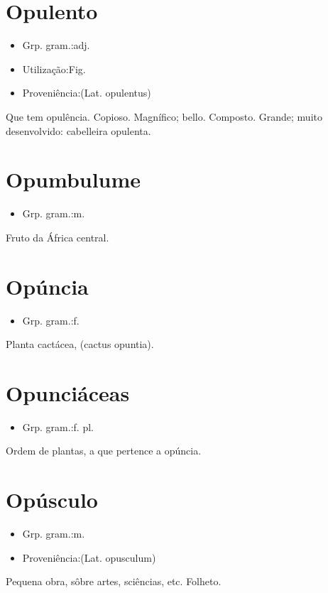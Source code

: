 \section{Opulento}
\begin{itemize}
\item {Grp. gram.:adj.}
\end{itemize}
\begin{itemize}
\item {Utilização:Fig.}
\end{itemize}
\begin{itemize}
\item {Proveniência:(Lat. \textunderscore opulentus\textunderscore )}
\end{itemize}
Que tem opulência.
Copioso.
Magnífico; bello.
Composto.
Grande; muito desenvolvido: \textunderscore cabelleira opulenta\textunderscore .
\section{Opumbulume}
\begin{itemize}
\item {Grp. gram.:m.}
\end{itemize}
Fruto da África central.
\section{Opúncia}
\begin{itemize}
\item {Grp. gram.:f.}
\end{itemize}
Planta cactácea, (\textunderscore cactus opuntia\textunderscore ).
\section{Opunciáceas}
\begin{itemize}
\item {Grp. gram.:f. pl.}
\end{itemize}
Ordem de plantas, a que pertence a opúncia.
\section{Opúsculo}
\begin{itemize}
\item {Grp. gram.:m.}
\end{itemize}
\begin{itemize}
\item {Proveniência:(Lat. \textunderscore opusculum\textunderscore )}
\end{itemize}
Pequena obra, sôbre artes, sciências, etc.
Folheto.
